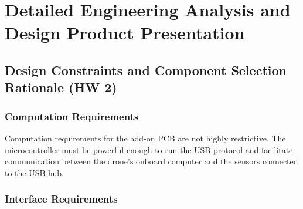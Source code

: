 \documentclass[12pt]{article}
\begin{document}
\section{Detailed Engineering Analysis and Design Product Presentation}
\subsection{Design Constraints and Component Selection Rationale (HW 2)}

\subsubsection{Computation Requirements}

Computation requirements for the add-on PCB are not highly restrictive. The microcontroller must be powerful enough to run the USB protocol and facilitate communication between the drone’s onboard computer and the sensors connected to the USB hub.

\subsubsection{Interface Requirements}
\end{document}

